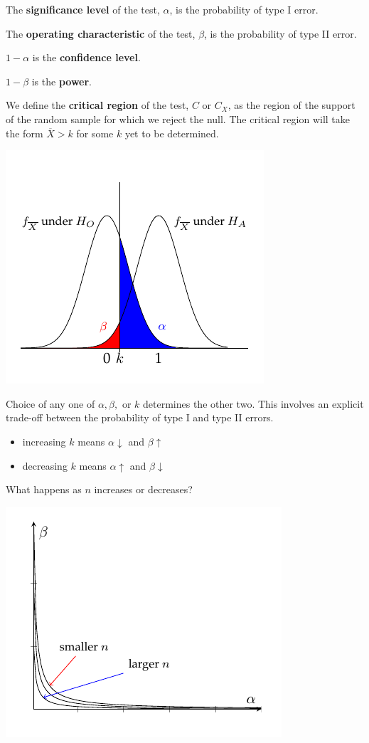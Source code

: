 \documentclass[a4paper,10pt,landscape]{article}
\begin{document}
\begin{multicols*}{3}
\begin{description}
	\item[] The {\bf significance level} of the test, $\alpha$, is the probability of type I error.
	\item The {\bf operating characteristic} of the test, $\beta$, is the probability of type II error.
	\item $1-\alpha$ is the {\bf confidence level}.
	\item $1-\beta$ is the {\bf power}.
	\item We define the {\bf critical region} of the test, $C$ or $C_X$, as the region of the support of the random sample for which we reject the null. The critical region will take the form $\overline{X}>k$ for some $k$ yet to be determined.
\end{description}
\begin{center}
	\includegraphics*[width=0.6\columnwidth,trim={0 0.4cm 0 1cm},clip]{power.pdf}
\end{center}
\begin{description}
	\item Choice of any one of $\alpha, \beta,$ or $k$ determines the other two. This involves an explicit trade-off between the probability of type I and type II errors.
	\begin{itemize}
		\item increasing $k$ means $\alpha\downarrow$ and $\beta\uparrow$
		\item decreasing $k$ means $\alpha\uparrow$ and $\beta\downarrow$
	\end{itemize}
	\item What happens as $n$ increases or decreases?
\end{description}
\begin{center}
	\includegraphics*[width=0.6\columnwidth,trim={0 0.4cm 0 0},clip]{betalpha.pdf}
\end{center}


\end{multicols*}
\end{document}
